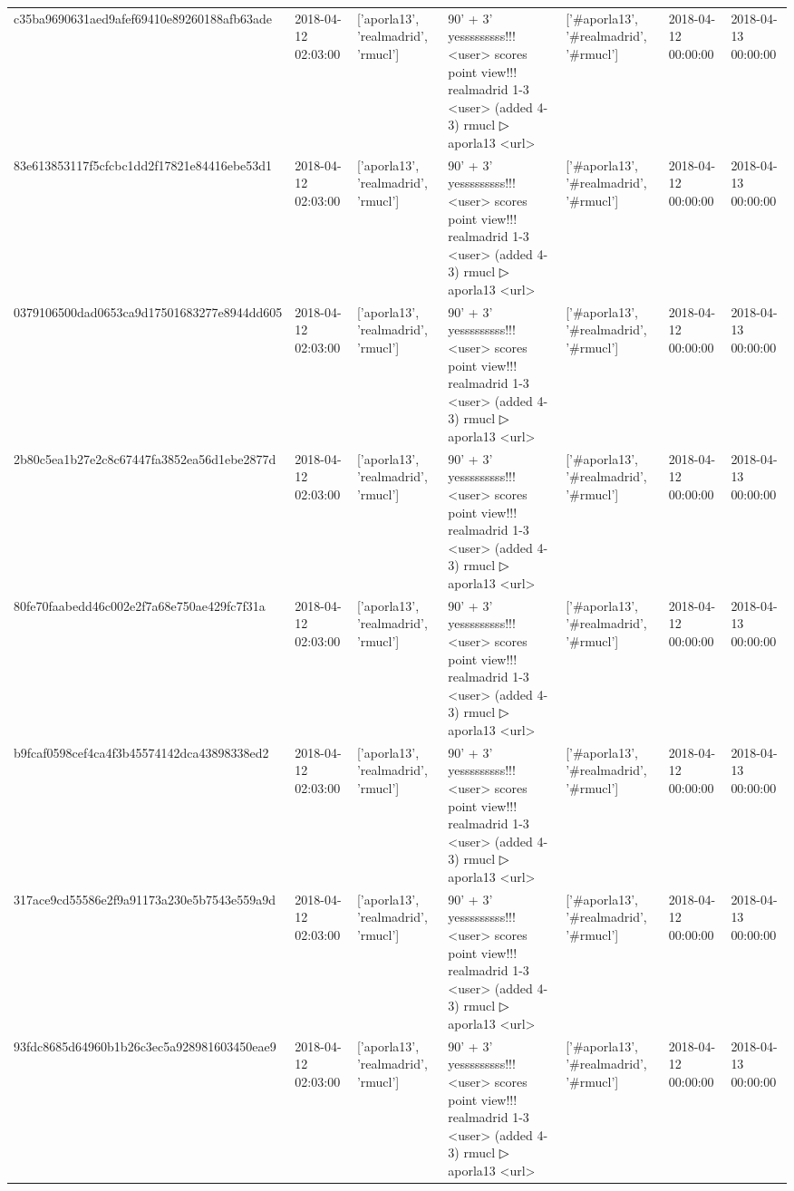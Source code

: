 \begin{tabular}{lllllll}
c35ba9690631aed9afef69410e89260188afb63ade & 2018-04-12 02:03:00 & ['aporla13', 'realmadrid', 'rmucl'] & 90' + 3' yesssssssss!!! <user> scores point view!!! realmadrid 1-3 <user> (added 4-3) rmucl ▷ aporla13 <url> & ['#aporla13', '#realmadrid', '#rmucl'] & 2018-04-12 00:00:00 & 2018-04-13 00:00:00 \\
83e613853117f5cfcbc1dd2f17821e84416ebe53d1 & 2018-04-12 02:03:00 & ['aporla13', 'realmadrid', 'rmucl'] & 90' + 3' yesssssssss!!! <user> scores point view!!! realmadrid 1-3 <user> (added 4-3) rmucl ▷ aporla13 <url> & ['#aporla13', '#realmadrid', '#rmucl'] & 2018-04-12 00:00:00 & 2018-04-13 00:00:00 \\
0379106500dad0653ca9d17501683277e8944dd605 & 2018-04-12 02:03:00 & ['aporla13', 'realmadrid', 'rmucl'] & 90' + 3' yesssssssss!!! <user> scores point view!!! realmadrid 1-3 <user> (added 4-3) rmucl ▷ aporla13 <url> & ['#aporla13', '#realmadrid', '#rmucl'] & 2018-04-12 00:00:00 & 2018-04-13 00:00:00 \\
2b80c5ea1b27e2c8c67447fa3852ea56d1ebe2877d & 2018-04-12 02:03:00 & ['aporla13', 'realmadrid', 'rmucl'] & 90' + 3' yesssssssss!!! <user> scores point view!!! realmadrid 1-3 <user> (added 4-3) rmucl ▷ aporla13 <url> & ['#aporla13', '#realmadrid', '#rmucl'] & 2018-04-12 00:00:00 & 2018-04-13 00:00:00 \\
80fe70faabedd46c002e2f7a68e750ae429fc7f31a & 2018-04-12 02:03:00 & ['aporla13', 'realmadrid', 'rmucl'] & 90' + 3' yesssssssss!!! <user> scores point view!!! realmadrid 1-3 <user> (added 4-3) rmucl ▷ aporla13 <url> & ['#aporla13', '#realmadrid', '#rmucl'] & 2018-04-12 00:00:00 & 2018-04-13 00:00:00 \\
b9fcaf0598cef4ca4f3b45574142dca43898338ed2 & 2018-04-12 02:03:00 & ['aporla13', 'realmadrid', 'rmucl'] & 90' + 3' yesssssssss!!! <user> scores point view!!! realmadrid 1-3 <user> (added 4-3) rmucl ▷ aporla13 <url> & ['#aporla13', '#realmadrid', '#rmucl'] & 2018-04-12 00:00:00 & 2018-04-13 00:00:00 \\
317ace9cd55586e2f9a91173a230e5b7543e559a9d & 2018-04-12 02:03:00 & ['aporla13', 'realmadrid', 'rmucl'] & 90' + 3' yesssssssss!!! <user> scores point view!!! realmadrid 1-3 <user> (added 4-3) rmucl ▷ aporla13 <url> & ['#aporla13', '#realmadrid', '#rmucl'] & 2018-04-12 00:00:00 & 2018-04-13 00:00:00 \\
93fdc8685d64960b1b26c3ec5a928981603450eae9 & 2018-04-12 02:03:00 & ['aporla13', 'realmadrid', 'rmucl'] & 90' + 3' yesssssssss!!! <user> scores point view!!! realmadrid 1-3 <user> (added 4-3) rmucl ▷ aporla13 <url> & ['#aporla13', '#realmadrid', '#rmucl'] & 2018-04-12 00:00:00 & 2018-04-13 00:00:00 \\

\end{tabular}
